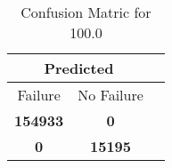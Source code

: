 \begin{table}[] 
\caption{Confusion Matric for 100.0} 
\label{Table: Prediction Accuracy-LOF100.0RandomForest100EKF-ignoreReflection-Reflection} 
\centering 
\begin{tabular} 
 {@{}ccc@{}} 
\toprule 
\multicolumn{2}{c}{\textbf{Predicted}}
 \\ \midrule 
\multicolumn{1}{|c|}{Failure} & 
\multicolumn{1}{c|}{No Failure}
 \\ \midrule 
\multicolumn{1}{|c|}{\color{green}\textbf{154933}} & 
\multicolumn{1}{c|}{\color{red}\textbf{0}}
 \\ \midrule 
\multicolumn{1}{|c|}{\color{red}\textbf{0}} & 
\multicolumn{1}{c|}{\color{green}\textbf{15195}}
 \\ \bottomrule 
\end{tabular} 
\end{table} 
